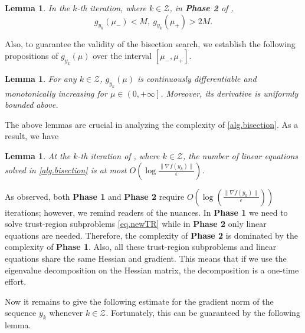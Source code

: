 \documentclass{article}
\theoremstyle{plain}
\newtheorem{lemma}[theorem]{Lemma}
\theoremstyle{definition}
\theoremstyle{remark}
\begin{document}
\begin{lemma}\label{lem.valid bracketing}
    \label{eq.valid bracketing}
    In the $k$-th iteration, where $k\in\mathcal{Z}$, in \textbf{Phase 2} of ,
    \begin{equation*}
        g_{y_k}(\mu_-) < M, \ g_{y_k}(\mu_+) >2M.
    \end{equation*}
\end{lemma}

Also, to guarantee the validity of the bisection search, we establish the following propositions of $g_{y_k}(\mu)$ over the interval $\left[\mu_-,\mu_+\right]$.
\begin{lemma}
    \label{lem.property g}
    For any $k\in\mathcal{Z}$, $g_{y_k}(\mu)$ is continuously differentiable and monotonically increasing for $\mu \in \left (0,+\infty\right ]$. Moreover, its derivative is uniformly bounded above.
\end{lemma}
The above lemmas are crucial in analyzing the complexity of \cref{alg.bisection}. As a result, we have
\begin{lemma}
    \label{lem.bound initial interval}
    At the $k$-th iteration of , where $k\in\mathcal{Z}$, the number of linear equations solved in \cref{alg.bisection} is at most $O(\log \frac{\|\nabla f(y_k)\|}{\epsilon})$.
\end{lemma}
As observed, both \textbf{Phase 1} and \textbf{Phase 2} require $O\left(\log\left(\tfrac{\|\nabla f(y_k)\|}{\epsilon}\right)\right)$ iterations; however, we remind readers of the nuances. In \textbf{Phase 1} we need to solve trust-region subproblems \eqref{eq.newTR} while in \textbf{Phase 2} only linear equations are needed. Therefore, the complexity of \textbf{Phase 2} is dominated by the complexity of \textbf{Phase 1}. Also, all these trust-region subproblems and linear equations share the same Hessian and gradient. This means that if we use the eigenvalue decomposition on the Hessian matrix, the decomposition is a one-time effort.

Now it remains to give the following estimate for the gradient norm of the sequence $y_k$ whenever $k\in \mathcal{Z}$. Fortunately, this can be guaranteed by the following lemma.
\end{document}
